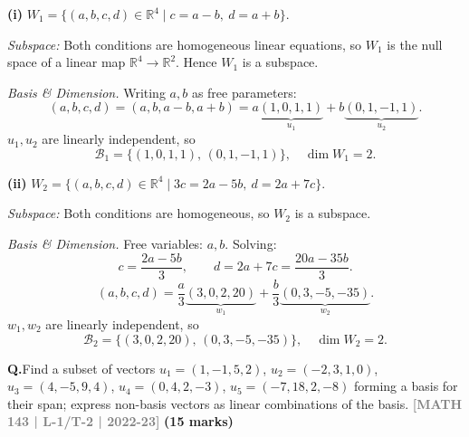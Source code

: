 \documentclass[12pt,a3paper]{article}
\newcommand{\yr}[1]{\hfill\textcolor{gray}{\small\textbf{[#1]}}}
\newcommand{\mk}[1]{\textcolor{orange!70!black}{\small\textbf{(#1 marks)}}}
\newcounter{qnum}
\newcommand{\Q}[1]{%
  \needspace{4\baselineskip}
  \refstepcounter{qnum}
  \vspace{6pt}
  \noindent\textbf{Q\theqnum.}\enspace #1\par
}
\begin{document}
\begin{tcolorbox}[enhanced,breakable,
  colback=cC!4,colframe=cC,boxrule=0.8pt,arc=5pt,
  title={\textbf{Answer --- Subspaces of $\mathbb{R}^4$}},
  fonttitle=\bfseries\color{white},colbacktitle=cC]

\textbf{(i)} $W_1 = \{(a,b,c,d)\in\mathbb{R}^4 \mid c=a-b,\ d=a+b\}$.

\medskip
\textit{Subspace:} Both conditions are homogeneous linear equations, so $W_1$ is the
null space of a linear map $\mathbb{R}^4\to\mathbb{R}^2$. Hence $W_1$ is a subspace.

\medskip
\textit{Basis \& Dimension.} Writing $a,b$ as free parameters:
\[
  (a,b,c,d)=(a,b,a-b,a+b)
  =a\underbrace{(1,0,1,1)}_{u_1}+b\underbrace{(0,1,-1,1)}_{u_2}.
\]
$u_1,u_2$ are linearly independent, so
\[
  \boxed{\mathcal{B}_1=\{(1,0,1,1),\,(0,1,-1,1)\},\quad \dim W_1=2.}
\]

\medskip
\textbf{(ii)} $W_2=\{(a,b,c,d)\in\mathbb{R}^4\mid 3c=2a-5b,\ d=2a+7c\}$.

\medskip
\textit{Subspace:} Both conditions are homogeneous, so $W_2$ is a subspace.

\medskip
\textit{Basis \& Dimension.} Free variables: $a,b$. Solving:
\[
  c=\frac{2a-5b}{3},\qquad
  d=2a+7c=\frac{20a-35b}{3}.
\]
\[
  (a,b,c,d)=\frac{a}{3}\underbrace{(3,0,2,20)}_{w_1}+\frac{b}{3}\underbrace{(0,3,-5,-35)}_{w_2}.
\]
$w_1,w_2$ are linearly independent, so
\[
  \boxed{\mathcal{B}_2=\{(3,0,2,20),\,(0,3,-5,-35)\},\quad \dim W_2=2.}
\]

\end{tcolorbox}

\Q{Find a subset of vectors $u_1 = (1,-1,5,2)$, $u_2 = (-2,3,1,0)$, $u_3 = (4,-5,9,4)$, $u_4 = (0,4,2,-3)$, $u_5 = (-7,18,2,-8)$ forming a basis for their span; express non-basis vectors as linear combinations of the basis.
\yr{MATH 143 | L-1/T-2 | 2022-23} \mk{15}}
\end{document}
